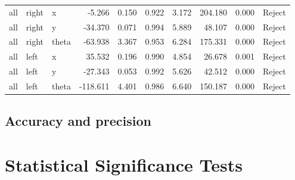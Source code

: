 \begin{table}[]
\begin{tabular}{@{}lllrrrrrrl@{}}
    all    & right     & x               & -5.266   & 0.150    & 0.922    & 3.172     & 204.180   & 0.000   & Reject            \\
    all    & right     & y               & -34.370  & 0.071    & 0.994    & 5.889     & 48.107    & 0.000   & Reject            \\
    all    & right     & theta           & -63.938  & 3.367    & 0.953    & 6.284     & 175.331   & 0.000   & Reject            \\
    all    & left      & x               & 35.532   & 0.196    & 0.990    & 4.854     & 26.678    & 0.001   & Reject            \\
    all    & left      & y               & -27.343  & 0.053    & 0.992    & 5.626     & 42.512    & 0.000   & Reject            \\
    all    & left      & theta           & -118.611 & 4.401    & 0.986    & 6.640     & 150.187   & 0.000   & Reject            \\ \bottomrule
    \end{tabular}
    \end{table}

    \subsection{Accuracy and precision}
    
    \section{Statistical Significance Tests}
